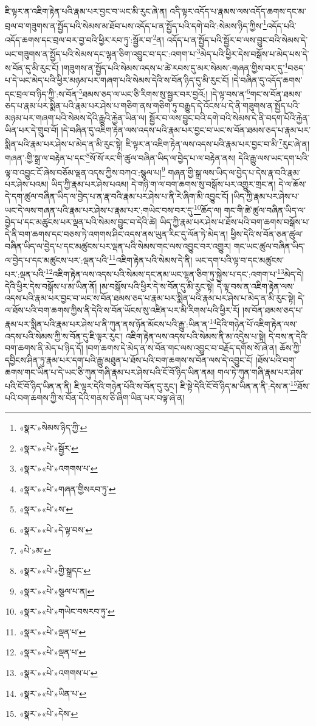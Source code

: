 ཇི་ལྟར་ན་འཇིག་རྟེན་པའི་རྣམ་པར་བྱང་བ་ཡང་མི་རུང་ཞེ་ན། འདི་ལྟར་འདོད་པ་རྣམས་ལས་འདོད་ཆགས་དང་མ་བྲལ་བ་གཟུགས་ན་སྤྱོད་པའི་སེམས་མ་ཐོབ་པས་འདོད་པ་ན་སྤྱོད་པའི་དགེ་བའི་:སེམས་ཉིད་ཀྱིས་\footnote{«སྣར་»སེམས་ཉིད་ཀྱི་}འདོད་པའི་འདོད་ཆགས་དང་བྲལ་བར་བྱ་བའི་ཕྱིར་རབ་ཏུ་:སྦྱོར་བ་\footnote{«སྣར་»«པེ་»སྦྱོར་}ན། འདོད་པ་ན་སྤྱོད་པའི་སྦྱོར་བ་ལས་བྱུང་བའི་སེམས་དེ་ཡང་གཟུགས་ན་སྤྱོད་པའི་སེམས་དང་ལྷན་ཅིག་འབྱུང་བ་དང་:འགག་པ་\footnote{«སྣར་»«པེ་»འགགས་པ་}མེད་པའི་ཕྱིར་དེས་བསྒོས་པ་མེད་པས་དེ་ས་བོན་དུ་མི་རུང་ངོ། །གཟུགས་ན་སྤྱོད་པའི་སེམས་འདས་པ་ཚེ་རབས་དུ་མར་སེམས་:གཞན་གྱིས་བར་དུ་\footnote{«སྣར་»«པེ་»གཞན་གྱིསརབ་ཏུ་}བཅད་པ་དེ་ཡང་མེད་པའི་ཕྱིར་མཉམ་པར་གཞག་པའི་སེམས་དེའི་ས་བོན་ཉིད་དུ་མི་རུང་ངོ། །དེ་བཞིན་དུ་འདོད་ཆགས་དང་བྲལ་བ་ཉིད་ཀྱི་:ས་བོན་\footnote{«སྣར་»«པེ་»ས་}ཐམས་ཅད་ལ་ཡང་ཅི་རིགས་སུ་སྦྱར་བར་བྱའོ:། །དེ་ལྟ་བས་ན་\footnote{«སྣར་»«པེ་»དེ་ལྟ་བས་}གང་ས་བོན་ཐམས་ཅད་པ་རྣམ་པར་སྨིན་པའི་རྣམ་པར་ཤེས་པ་གཅིག་ནས་གཅིག་ཏུ་བརྒྱུད་དེ་འོངས་པ་དེ་ནི་གཟུགས་ན་སྤྱོད་པའི་མཉམ་པར་གཞག་པའི་སེམས་དེའི་རྒྱུའི་རྐྱེན་ཡིན་ལ། སྦྱོར་བ་ལས་བྱུང་བའི་དགེ་བའི་སེམས་དེ་ནི་བདག་པོའི་རྐྱེན་ཡིན་པར་དེ་གྲུབ་བོ། །དེ་བཞིན་དུ་འཇིག་རྟེན་ལས་འདས་པའི་རྣམ་པར་བྱང་བ་ཡང་ས་བོན་ཐམས་ཅད་པ་རྣམ་པར་སྨིན་པའི་རྣམ་པར་ཤེས་པ་མེད་ན་མི་རུང་སྟེ། ཇི་ལྟར་ན་འཇིག་རྟེན་ལས་འདས་པའི་རྣམ་པར་བྱང་བ་མི་\footnote{«པེ་»མ་}རུང་ཞེ་ན། གཞན་:གྱི་སྒྲ་ལ་བརྟེན་པ་དང་\footnote{«སྣར་»«པེ་»གྱི་སྒྲདང་}སོ་སོ་རང་གི་ཚུལ་བཞིན་ཡིད་ལ་བྱེད་པ་ལ་བརྟེན་ནས། དེའི་རྒྱུ་ལས་ཡང་དག་པའི་ལྟ་བ་འབྱུང་ངོ་ཞེས་བཅོམ་ལྡན་འདས་ཀྱིས་བཀའ་:སྩལ་པ།\footnote{«སྣར་»«པེ་»སྩལ་པ་ན།} གཞན་གྱི་སྒྲ་ལས་ཡིད་ལ་བྱེད་པ་དེས་རྣ་བའི་རྣམ་པར་ཤེས་པའམ། ཡིད་ཀྱི་རྣམ་པར་ཤེས་པའམ། དེ་གཉི་ག་ལ་བག་ཆགས་སུ་བསྒོས་པར་འགྱུར་གྲང་ན། དེ་ལ་ཆོས་དེ་དག་ཚུལ་བཞིན་ཡིད་ལ་བྱེད་པ་ན་རྣ་བའི་རྣམ་པར་ཤེས་པ་ནི་རེ་ཞིག་མི་འབྱུང་ངོ། །ཡིད་ཀྱི་རྣམ་པར་ཤེས་པ་ཡང་དེ་ལས་གཞན་པའི་རྣམ་པར་ཤེས་པ་རྣམ་པར་:གཡེང་བས་བར་དུ་\footnote{«སྣར་»«པེ་»གཡེང་བསརབ་ཏུ་}ཆོད་ལ། གང་གི་ཚེ་ཚུལ་བཞིན་ཡིད་ལ་བྱེད་པ་དང་མཚུངས་པར་ལྡན་པའི་སེམས་བྱུང་བ་དེའི་ཚེ། ཡིད་ཀྱི་རྣམ་པར་ཤེས་པ་ཐོས་པའི་བག་ཆགས་བསྒོས་པ་དེ་ནི་བག་ཆགས་དང་བཅས་ཏེ་འགགས་ཤིང་འདས་ནས་ཡུན་རིང་དུ་ལོན་ཏེ་མེད་ན། ཕྱིས་དེའི་ས་བོན་ཅན་ཚུལ་བཞིན་ཡིད་ལ་བྱེད་པ་དང་མཚུངས་པར་ལྡན་པའི་སེམས་གང་ལས་འབྱུང་བར་འགྱུར། གང་ཡང་ཚུལ་བཞིན་ཡིད་ལ་བྱེད་པ་དང་མཚུངས་པར་:ལྡན་པའི་\footnote{«སྣར་»«པེ་»ལྡན་པ་}འཇིག་རྟེན་པའི་སེམས་དེ་ནི། ཡང་དག་པའི་ལྟ་བ་དང་མཚུངས་པར་:ལྡན་པའི་\footnote{«སྣར་»«པེ་»ལྡན་པ་}འཇིག་རྟེན་ལས་འདས་པའི་སེམས་དང་ནམ་ཡང་ལྷན་ཅིག་ཏུ་སྐྱེས་པ་དང་:འགག་པ་\footnote{«སྣར་»«པེ་»འགགས་པ་}མེད་དེ། དེའི་ཕྱིར་དེས་བསྒོས་པ་མ་ཡིན་ནོ། །མ་བསྒོས་པའི་ཕྱིར་དེ་ས་བོན་དུ་མི་རུང་སྟེ། དེ་ལྟ་བས་ན་འཇིག་རྟེན་ལས་འདས་པའི་རྣམ་པར་བྱང་བ་ཡང་ས་བོན་ཐམས་ཅད་པ་རྣམ་པར་སྨིན་པའི་རྣམ་པར་ཤེས་པ་མེད་ན་མི་རུང་སྟེ། དེ་ལ་ཐོས་པའི་བག་ཆགས་ཀྱིས་ནི་དེའི་ས་བོན་ཡོངས་སུ་འཛིན་པར་མི་རིགས་པའི་ཕྱིར་རོ། །ས་བོན་ཐམས་ཅད་པ་རྣམ་པར་སྨིན་པའི་རྣམ་པར་ཤེས་པ་ནི་ཀུན་ནས་ཉོན་མོངས་པའི་རྒྱུ་:ཡིན་ན་\footnote{«སྣར་»«པེ་»ཡིན་པ་}དེའི་གཉེན་པོ་འཇིག་རྟེན་ལས་འདས་པའི་སེམས་ཀྱི་ས་བོན་དུ་ཇི་ལྟར་རུང་། འཇིག་རྟེན་ལས་འདས་པའི་སེམས་ནི་མ་འདྲེས་པ་སྟེ། དེ་བས་ན་དེའི་བག་ཆགས་ནི་མེད་པ་ཉིད་དོ། །བག་ཆགས་དེ་མེད་ན་ས་བོན་གང་ལས་འབྱུང་བ་བརྗོད་དགོས་སོ་ཞེ་ན། ཆོས་ཀྱི་དབྱིངས་ཤིན་ཏུ་རྣམ་པར་དག་པའི་རྒྱུ་མཐུན་པ་ཐོས་པའི་བག་ཆགས་ས་བོན་ལས་དེ་འབྱུང་ངོ། །ཐོས་པའི་བག་ཆགས་གང་ཡིན་པ་དེ་ཡང་ཅི་ཀུན་གཞི་རྣམ་པར་ཤེས་པའི་ངོ་བོ་ཉིད་ཡིན་ནམ། གལ་ཏེ་ཀུན་གཞི་རྣམ་པར་ཤེས་པའི་ངོ་བོ་ཉིད་ཡིན་ན་ནི། ཇི་ལྟར་དེའི་གཉེན་པོའི་ས་བོན་དུ་རུང་། ཇི་སྟེ་དེའི་ངོ་བོ་ཉིད་མ་ཡིན་ན་ནི་:དེས་ན་\footnote{«སྣར་»«པེ་»དེས་}ཐོས་པའི་བག་ཆགས་ཀྱི་ས་བོན་དེའི་གནས་ཅི་ཞིག་ཡིན་པར་བལྟ་ཞེ་ན། 